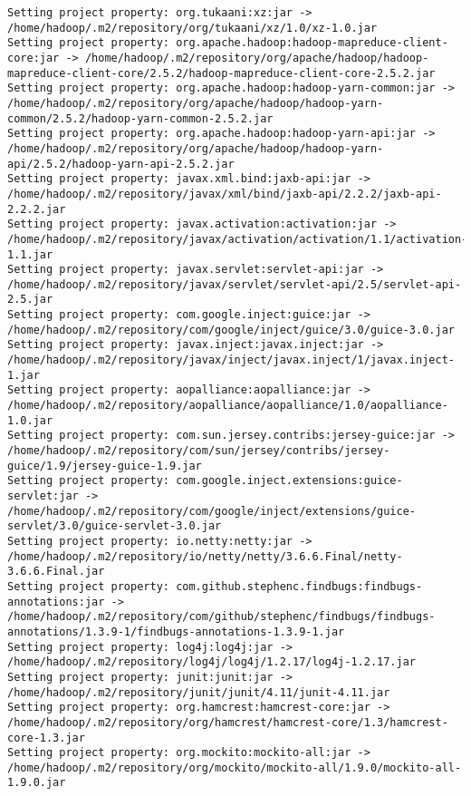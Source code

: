 \begin{verbatim}
Setting project property: org.tukaani:xz:jar -> /home/hadoop/.m2/repository/org/tukaani/xz/1.0/xz-1.0.jar
Setting project property: org.apache.hadoop:hadoop-mapreduce-client-core:jar -> /home/hadoop/.m2/repository/org/apache/hadoop/hadoop-mapreduce-client-core/2.5.2/hadoop-mapreduce-client-core-2.5.2.jar
Setting project property: org.apache.hadoop:hadoop-yarn-common:jar -> /home/hadoop/.m2/repository/org/apache/hadoop/hadoop-yarn-common/2.5.2/hadoop-yarn-common-2.5.2.jar
Setting project property: org.apache.hadoop:hadoop-yarn-api:jar -> /home/hadoop/.m2/repository/org/apache/hadoop/hadoop-yarn-api/2.5.2/hadoop-yarn-api-2.5.2.jar
Setting project property: javax.xml.bind:jaxb-api:jar -> /home/hadoop/.m2/repository/javax/xml/bind/jaxb-api/2.2.2/jaxb-api-2.2.2.jar
Setting project property: javax.activation:activation:jar -> /home/hadoop/.m2/repository/javax/activation/activation/1.1/activation-1.1.jar
Setting project property: javax.servlet:servlet-api:jar -> /home/hadoop/.m2/repository/javax/servlet/servlet-api/2.5/servlet-api-2.5.jar
Setting project property: com.google.inject:guice:jar -> /home/hadoop/.m2/repository/com/google/inject/guice/3.0/guice-3.0.jar
Setting project property: javax.inject:javax.inject:jar -> /home/hadoop/.m2/repository/javax/inject/javax.inject/1/javax.inject-1.jar
Setting project property: aopalliance:aopalliance:jar -> /home/hadoop/.m2/repository/aopalliance/aopalliance/1.0/aopalliance-1.0.jar
Setting project property: com.sun.jersey.contribs:jersey-guice:jar -> /home/hadoop/.m2/repository/com/sun/jersey/contribs/jersey-guice/1.9/jersey-guice-1.9.jar
Setting project property: com.google.inject.extensions:guice-servlet:jar -> /home/hadoop/.m2/repository/com/google/inject/extensions/guice-servlet/3.0/guice-servlet-3.0.jar
Setting project property: io.netty:netty:jar -> /home/hadoop/.m2/repository/io/netty/netty/3.6.6.Final/netty-3.6.6.Final.jar
Setting project property: com.github.stephenc.findbugs:findbugs-annotations:jar -> /home/hadoop/.m2/repository/com/github/stephenc/findbugs/findbugs-annotations/1.3.9-1/findbugs-annotations-1.3.9-1.jar
Setting project property: log4j:log4j:jar -> /home/hadoop/.m2/repository/log4j/log4j/1.2.17/log4j-1.2.17.jar
Setting project property: junit:junit:jar -> /home/hadoop/.m2/repository/junit/junit/4.11/junit-4.11.jar
Setting project property: org.hamcrest:hamcrest-core:jar -> /home/hadoop/.m2/repository/org/hamcrest/hamcrest-core/1.3/hamcrest-core-1.3.jar
Setting project property: org.mockito:mockito-all:jar -> /home/hadoop/.m2/repository/org/mockito/mockito-all/1.9.0/mockito-all-1.9.0.jar


\end{verbatim}
